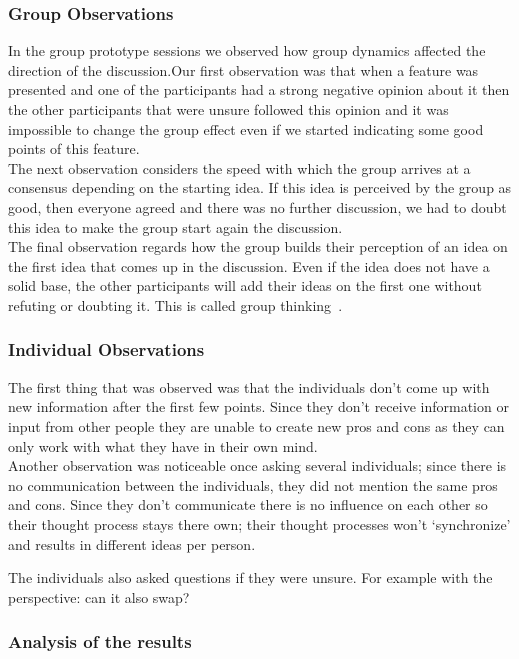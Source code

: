 \documentclass[main.tex]{subfiles}
\begin{document}
\subsubsection{Group Observations}

In the group prototype sessions we observed how group dynamics affected the direction of the discussion.Our first observation was that when a feature was presented and one of the participants had a strong negative opinion about it then the other participants that were unsure followed this opinion and it was impossible to change the group effect even if we started indicating some good points of this feature. \\

The next observation considers the speed with which the group arrives at a consensus depending on the starting idea. If this idea is perceived by the group as good, then everyone agreed and there was no further discussion, we had to doubt this idea to make the group start again the discussion.\\

The final observation regards how the group builds their perception of an idea on the first idea that comes up in the discussion. Even if the idea does not have a solid base, the other participants will add their ideas on the first one without refuting or doubting it. This is called group thinking~\cite{janis}.

\subsubsection{Individual Observations}
The first thing that was observed was that the individuals don't come up with new information after the first few points. Since they don't receive information or input from other people they are unable to create new pros and cons as they can only work with what they have in their own mind. \\
Another observation was noticeable once asking several individuals; since there is no communication between the individuals, they did not mention the same pros and cons. Since they don't communicate there is no influence on each other so their thought process stays there own; their thought processes won't `synchronize' and results in different ideas per person.

The individuals also asked questions if they were unsure. For example with the perspective: can it also swap?
\subsubsection{Analysis of the results}
\end{document}
